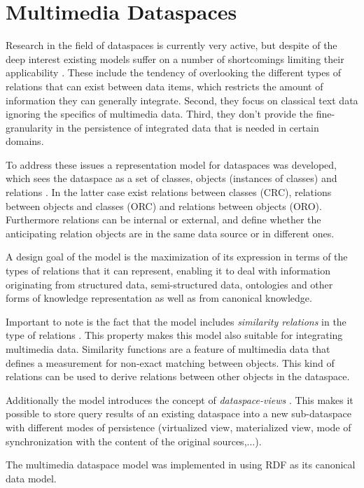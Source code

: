 \section{Multimedia Dataspaces}


Research in the field of dataspaces is currently very active, but despite of the deep interest existing models suffer on a number of shortcomings limiting their applicability \cite[p. 1]{6167826}.
These include the tendency of overlooking the different types of relations that can exist between data items, which restricts the amount of information they can generally integrate.
Second, they focus on classical text data ignoring the specifics of multimedia data. 
Third, they don't provide the fine-granularity in the persistence of integrated data that is needed in certain domains.

To address these issues a representation model for dataspaces was developed, which sees the dataspace as a set of classes, objects (instances of classes) and relations \cite[p. 1]{6167826}.
In the latter case exist relations between classes (CRC), relations between objects and classes (ORC) and relations between objects (ORO).
Furthermore relations can be internal or external, and define whether the anticipating relation objects are in the same data source or in different ones.

A design goal of the model is the maximization of its expression in terms of the types of relations that it can represent, enabling it to deal with information originating from structured data, semi-structured data, ontologies and other forms of knowledge representation as well as from canonical  
knowledge.

Important to note is the fact that the model includes \emph{similarity relations} in the type of relations \cite[p. 3-4]{6167826}. This property makes this model also suitable for integrating multimedia data.
Similarity functions are a feature of multimedia data that defines a measurement for non-exact matching between objects.
This kind of relations can be used to derive relations between other objects in the dataspace.

Additionally the model introduces the concept of \emph{dataspace-views} \cite[p. 3]{6167826}. 
This makes it possible to store query results of an existing dataspace into a new sub-dataspace with different modes of persistence (virtualized view, materialized view, mode of synchronization with the content of the original sources,...).

The multimedia dataspace model was implemented in \cite[p. 30]{ZerrikBachelorThesis} using RDF as its canonical data model.


